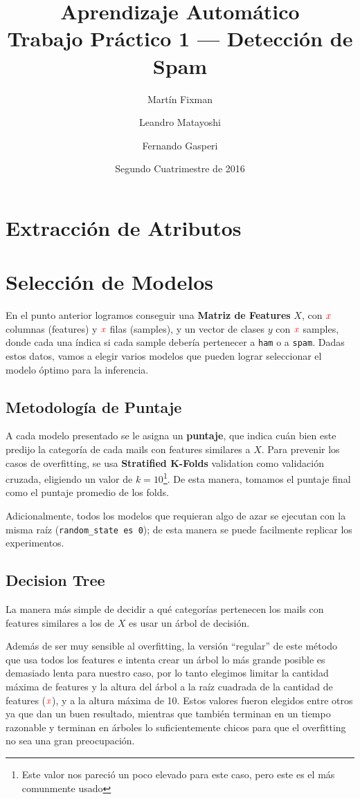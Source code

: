 \documentclass[a4paper, 11pt]{article}
\title{Aprendizaje Automático \\ Trabajo Práctico 1 --- Detección de Spam}
\author{Martín Fixman \and Leandro Matayoshi \and Fernando Gasperi}
\date{Segundo Cuatrimestre de 2016}
\newcommand{\todox}{\(\mathit{\color{red}x}\)}
\newcommand{\ham}{\large{\texttt{ham}}}
\newcommand{\spam}{\large{\texttt{spam}}}
\begin{document}
\maketitle

\newpage

\section{Extracción de Atributos}

\section{Selección de Modelos}

En el punto anterior logramos conseguir una \textbf{Matriz de Features} \( X \), con \todox{} columnas (features) y \todox{} filas (samples), y un vector de clases \( y \) con \todox{} samples, donde cada una índica si cada sample debería pertenecer a \ham{} o a \spam{}. Dadas estos datos, vamos a elegir varios modelos que pueden lograr seleccionar el modelo óptimo para la inferencia.

\subsection{Metodología de Puntaje}

A cada modelo presentado se le asigna un \textbf{puntaje}, que indica cuán bien este predijo la categoría de cada mails con features similares a \( X \). Para prevenir los casos de overfitting, se usa \textbf{Stratified K-Folds} validation como validación cruzada, eligiendo un valor de \( k = 10 \)\footnote{Este valor nos pareció un poco elevado para este caso, pero este es el más comunmente usado}. De esta manera, tomamos el puntaje final como el puntaje promedio de los folds.

Adicionalmente, todos los modelos que requieran algo de azar se ejecutan con la misma raíz (\texttt{random\_state es 0}); de esta manera se puede facilmente replicar los experimentos.

\subsection{Decision Tree}

La manera más simple de decidir a qué categorías pertenecen los mails con features similares a los de \( X \) es usar un árbol de decisión.

Además de ser muy sensible al overfitting, la versión ``regular'' de este método que usa todos los features e intenta crear un árbol lo más grande posible es demasiado lenta para nuestro caso, por lo tanto elegimos limitar la cantidad máxima de features y la altura del árbol a la raíz cuadrada de la cantidad de features (\todox{}), y a la altura máxima de 10. Estos valores fueron elegidos entre otros ya que dan un buen resultado, mientras que también terminan en un tiempo razonable y terminan en árboles lo suficientemente chicos para que el overfitting no sea una gran preocupación.
\end{document}
